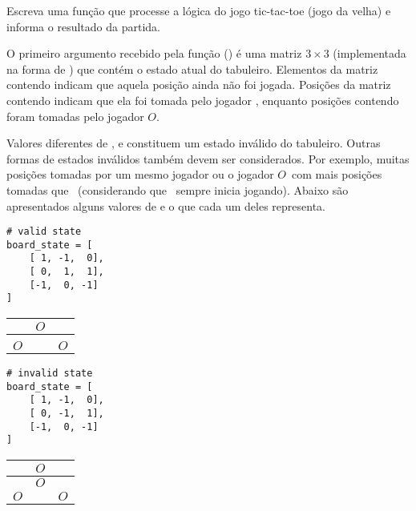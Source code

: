 \newcommand{\po}{{\color{MyDarkGreen}$O$}}
\newcommand{\px}{{\color{MyBrickRed}\ding{55}}}

Escreva uma função  que processe a lógica do jogo tic-tac-toe (jogo da velha)
e informa o resultado da partida.

   O primeiro argumento recebido pela função () é uma matriz $3\times3$ (implementada na forma de
) que contém o estado atual do tabuleiro.
Elementos da matriz contendo  indicam que aquela posição ainda não foi jogada.
Posições da matriz contendo  indicam que ela foi tomada pelo jogador \px, enquanto posições
contendo  foram tomadas pelo jogador \po.

Valores diferentes de ,  e  constituem um estado inválido do tabuleiro.
Outras formas de estados inválidos também devem ser considerados.
Por exemplo, muitas posições tomadas por um mesmo jogador ou o jogador \po~com mais posições tomadas que \px~(considerando que \px~sempre inicia jogando).
Abaixo são apresentados alguns valores de  e o que cada um deles representa.

\begin{minipage}{0.25\textwidth}
\begin{verbatim}
# valid state
board_state = [
    [ 1, -1,  0],
    [ 0,  1,  1],
    [-1,  0, -1]
]
\end{verbatim}
\end{minipage}
%
\begin{minipage}{0.2\textwidth}
{\renewcommand{\arraystretch}{1.45}
\begin{center}
\begin{tabular}{ c | c | c }
 \px & \po &  \\ \hline
  & \px &  \px\\ \hline
 \po &  & \po
\end{tabular}
\end{center}
}
\end{minipage}
%
%
%
\hspace{0.07\textwidth}
\begin{minipage}{0.25\textwidth}
\begin{verbatim}
# invalid state
board_state = [
    [ 1, -1,  0],
    [ 0, -1,  1],
    [-1,  0, -1]
]
\end{verbatim}
\end{minipage}
%
\begin{minipage}{0.2\textwidth}
{\renewcommand{\arraystretch}{1.45}
\begin{center}
\begin{tabular}{ c | c | c }
 \px & \po &  \\ \hline
  & \po &  \px\\ \hline
 \po &  & \po
\end{tabular}
\end{center}
}
\end{minipage}


